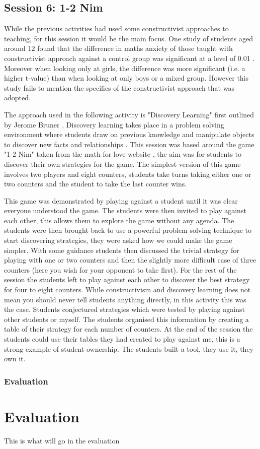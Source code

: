 \documentclass[11pt, a4paper, notitlepage]{article}
\begin{document}
\subsection{Session 6: 1-2 Nim}
While the previous activities had used some constructivist approaches to teaching, for this session it would be the main focus. One study of students aged around 12 found that the difference in maths anxiety of those taught with constructivist approach against a control group was significant at a level of 0.01 \cite{Suman:2021}. Moreover when looking only at girls, the difference was more significant (i.e. a higher t-value) than when looking at only boys or a mixed group. However this study fails to mention the specifics of the constructivist approach that was adopted. 
\par
The approach used in the following activity is "Discovery Learning" first outlined by Jerome Bruner \cite{Bruner:1961}. Discovery learning takes place in a problem solving environment where students draw on previous knowledge and manipulate objects to discover new facts and relationships \cite{learning-theories:Discovery-learning}. This session was based around the game "1-2 Nim" taken from the math for love website \cite{1-2Nim}, the aim was for students to discover their own strategies for the game. The simplest version of this game involves two players and eight counters, students take turns taking either one or two counters and the student to take the last counter wins.
\par
This game was demonstrated by playing against a student until it was clear everyone understood the game. The students were then invited to play against each other, this allows them to explore the game without any agenda. The students were then brought back to use a powerful problem solving technique to start discovering strategies, they were asked how we could make the game simpler. With some guidance students then discussed the trivial strategy for playing with one or two counters and then the slightly more difficult case of three counters (here you wish for your opponent to take first). For the rest of the session the students left to play against each other to discover the best strategy for four to eight counters. While constructivism and discovery learning does not mean you should never tell students anything directly, in this activity this was the case. Students conjectured strategies which were tested by playing against other students or myself. The students organised this information by creating a table of their strategy for each number of counters. At the end of the session the students could use their tables they had created to play against me, this is a strong example of student ownership. The students built a tool, they use it, they own it. 

\subsubsection*{Evaluation}





\section{Evaluation}
This is what will go in the evaluation



\end{document}
